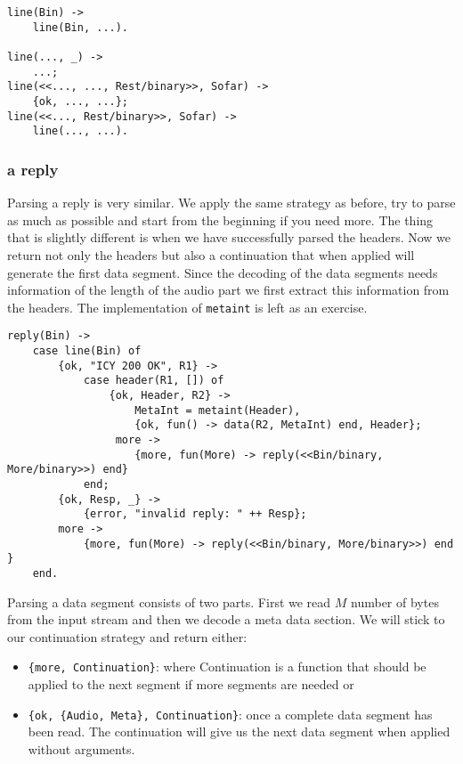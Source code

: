 \documentclass[a4paper,11pt]{article}
\begin{document}
\begin{verbatim}
line(Bin) ->
    line(Bin, ...).

line(..., _) ->
    ...;
line(<<..., ..., Rest/binary>>, Sofar) ->
    {ok, ..., ...};
line(<<..., Rest/binary>>, Sofar) ->
    line(..., ...).
\end{verbatim}

\subsubsection{a reply}

Parsing a reply is very similar. We apply the same strategy as before,
try to parse as much as possible and start from the beginning if you
need more. The thing that is slightly different is when we have
successfully parsed the headers. Now we return not only the headers
but also a continuation that when applied will generate the first data
segment. Since the decoding of the data segments needs information of
the length of the audio part we first extract this information from
the headers. The implementation of {\tt metaint} is left as an
exercise.


\begin{verbatim}
reply(Bin) ->
    case line(Bin) of
        {ok, "ICY 200 OK", R1} ->
            case header(R1, []) of
                {ok, Header, R2} ->
                    MetaInt = metaint(Header),
                    {ok, fun() -> data(R2, MetaInt) end, Header};
                 more ->
                    {more, fun(More) -> reply(<<Bin/binary, More/binary>>) end}
            end;
        {ok, Resp, _} ->
            {error, "invalid reply: " ++ Resp};
        more ->
            {more, fun(More) -> reply(<<Bin/binary, More/binary>>) end }
    end.
\end{verbatim}


Parsing a data segment consists of two parts. First we read $M$
number of bytes from the input stream and then we decode a meta data
section. We will stick to our continuation strategy and return either:

\begin{itemize} 

\item {\tt \{more, Continuation\}}: where Continuation is a function
  that should be applied to the next segment if more segments are
  needed or

\item {\tt \{ok, \{Audio, Meta\}, Continuation\}}: once a complete
  data segment has been read. The continuation will give us the next
  data segment when applied without arguments. 

\end{itemize}
\end{document}
